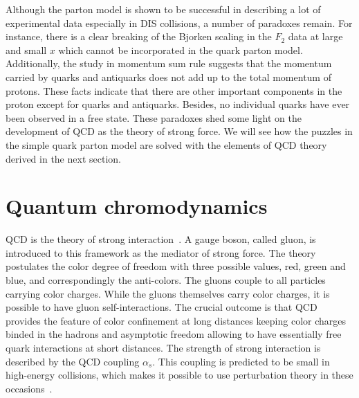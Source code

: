 Although the parton model is shown to be successful in describing a lot of
experimental data especially in DIS collisions, a number of paradoxes remain.
For instance, there is a clear breaking of the Bjorken scaling in the $F_{2}$
data at large and small $x$ which cannot be incorporated in the quark parton
model. Additionally, the study in momentum sum rule suggests that the momentum carried by
quarks and antiquarks does not add up to the total momentum of protons. These facts
indicate that there are other important components in the proton except for
quarks and antiquarks. Besides, no individual quarks have ever been observed in a free
state. These paradoxes shed some light on the development of QCD as the theory
of strong force. We will see how the puzzles in the simple quark parton model
are solved with the elements of QCD theory derived in the next section.




\section{Quantum chromodynamics} \label{sec:QCD}
QCD is the theory of strong interaction~\cite{Politzer:1974fr}. A gauge
boson, called gluon, is introduced to this framework as the mediator of strong
force. The theory postulates the color degree of freedom with three possible
values, red, green and blue, and correspondingly the anti-colors. The gluons
couple to all particles carrying color charges. While the gluons themselves
carry color charges, it is possible to have gluon self-interactions. The crucial
outcome is that QCD provides the feature of color confinement at long distances
keeping color charges binded in the hadrons and asymptotic freedom allowing to
have essentially free quark interactions at short distances. The strength of
strong interaction is described by the QCD coupling $\alpha_{s}$. This coupling
is predicted to be small in high-energy collisions, which makes it possible to
use perturbation theory in these occasions~\cite{Lipatov:1974qm}.


